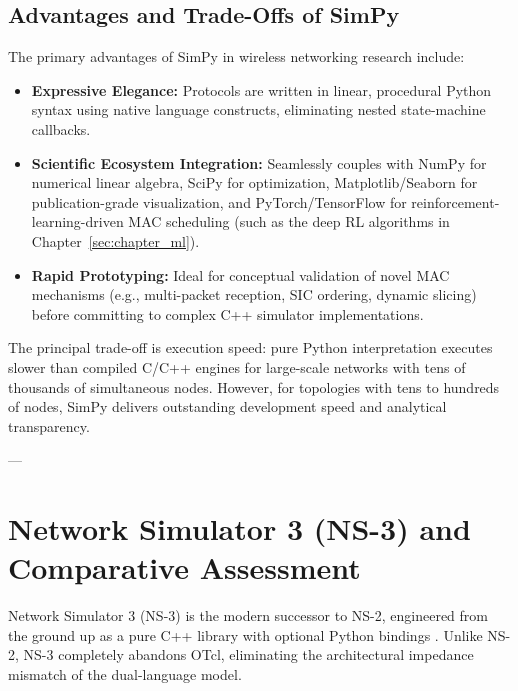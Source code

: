 \subsection{Advantages and Trade-Offs of SimPy}
The primary advantages of SimPy in wireless networking research include:
\begin{itemize}
    \item \textbf{Expressive Elegance:} Protocols are written in linear, procedural Python syntax using native language constructs, eliminating nested state-machine callbacks.
    \item \textbf{Scientific Ecosystem Integration:} Seamlessly couples with NumPy for numerical linear algebra, SciPy for optimization, Matplotlib/Seaborn for publication-grade visualization, and PyTorch/TensorFlow for reinforcement-learning-driven MAC scheduling (such as the deep RL algorithms in Chapter~\ref{sec:chapter_ml}).
    \item \textbf{Rapid Prototyping:} Ideal for conceptual validation of novel MAC mechanisms (e.g., multi-packet reception, SIC ordering, dynamic slicing) before committing to complex C++ simulator implementations.
\end{itemize}
The principal trade-off is execution speed: pure Python interpretation executes slower than compiled C/C++ engines for large-scale networks with tens of thousands of simultaneous nodes. However, for topologies with tens to hundreds of nodes, SimPy delivers outstanding development speed and analytical transparency.

---

\section{Network Simulator 3 (NS-3) and Comparative Assessment}
\label{sec:ns3_summary}

Network Simulator 3 (NS-3) is the modern successor to NS-2, engineered from the ground up as a pure C++ library with optional Python bindings \cite{henderson2008network}. Unlike NS-2, NS-3 completely abandons OTcl, eliminating the architectural impedance mismatch of the dual-language model.

